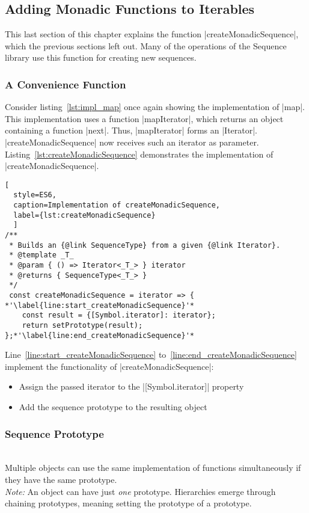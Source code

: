 \subsection{Adding Monadic Functions to Iterables}
\label{sub:Adding Monadic Functions to Iterables}
This last section of this chapter explains the function
|createMonadicSequence|, which the previous sections left out. Many of the
operations of the Sequence library use this function for creating new
sequences.

\subsubsection{A Convenience Function}
\label{subsub:A Convenience Function}
Consider listing~\ref{lst:impl_map} once again showing the implementation of
|map|. This implementation uses a function |mapIterator|, which returns an
object containing a function |next|. Thus, |mapIterator| forms an |Iterator|.
|createMonadicSequence| now receives such an iterator as parameter.
Listing~\ref{lst:createMonadicSequence} demonstrates the implementation of
|createMonadicSequence|.

\begin{lstlisting}[
  style=ES6, 
  caption=Implementation of createMonadicSequence,
  label={lst:createMonadicSequence}
  ]
/**
 * Builds an {@link SequenceType} from a given {@link Iterator}.
 * @template _T_
 * @param { () => Iterator<_T_> } iterator
 * @returns { SequenceType<_T_> }
 */
 const createMonadicSequence = iterator => { *'\label{line:start_createMonadicSequence}'*
    const result = {[Symbol.iterator]: iterator};
    return setPrototype(result);
};*'\label{line:end_createMonadicSequence}'*
\end{lstlisting}

Line~\ref{line:start_createMonadicSequence}
to~\ref{line:end_createMonadicSequence} implement the functionality of
|createMonadicSequence|:

\begin{itemize}
  \item{Assign the passed iterator to the |[Symbol.iterator]| property}
  \item{Add the sequence prototype to the resulting object}
\end{itemize}


\subsubsection{Sequence Prototype}
\label{subsub:Sequence Prototype}
\\ 
Multiple objects can use the same implementation of functions simultaneously if
they have the same prototype.\\
\textit{Note:} An object can have just \textit{one} prototype. Hierarchies
emerge through chaining prototypes, meaning setting the prototype of a
prototype.

